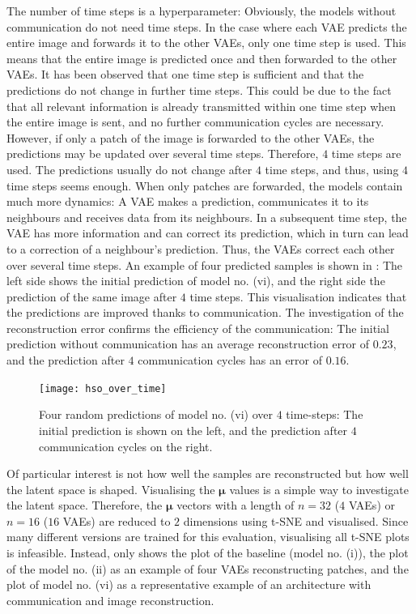 The number of time steps is a hyperparameter: Obviously, the models without communication do not need time steps. In the case where each VAE predicts the entire image and forwards it to the other VAEs, only one time step is used. This means that the entire image is predicted once and then forwarded to the other VAEs. It has been observed that one time step is sufficient and that the predictions do not change in further time steps. This could be due to the fact that all relevant information is already transmitted within one time step when the entire image is sent, and no further communication cycles are necessary. However, if only a patch of the image is forwarded to the other VAEs, the predictions may be updated over several time steps. Therefore, $4$ time steps are used. The predictions usually do not change after $4$ time steps, and thus, using $4$ time steps seems enough. When only patches are forwarded, the models contain much more dynamics: A VAE makes a prediction, communicates it to its neighbours and receives data from its neighbours. In a subsequent time step, the VAE has more information and can correct its prediction, which in turn can lead to a correction of a neighbour's prediction. Thus, the VAEs correct each other over several time steps. An example of four predicted samples is shown in : The left side shows the initial prediction of model no. (vi), and the right side the prediction of the same image after $4$ time steps. This visualisation indicates that the predictions are improved thanks to communication. The investigation of the reconstruction error confirms the efficiency of the communication: The initial prediction without communication has an average reconstruction error of $0.23$, and the prediction after $4$ communication cycles has an error of $0.16$.

\begin{figure}[h]
    \centering
    \texttt{[image: hso\_over\_time]}
    \caption[Change of the model's prediction over time]{Four random predictions of model no. (vi) over $4$ time-steps: The initial prediction is shown on the left, and the prediction after $4$ communication cycles on the right.}
\end{figure}

Of particular interest is not how well the samples are reconstructed but how well the latent space is shaped. Visualising the $\boldsymbol{\mu}$ values is a simple way to investigate the latent space. Therefore, the $\boldsymbol{\mu}$ vectors with a length of $n=32$ ($4$ VAEs) or $n=16$ ($16$ VAEs) are reduced to $2$ dimensions using t-SNE  and visualised. Since many different versions are trained for this evaluation, visualising all t-SNE plots is infeasible. Instead,  only shows the plot of the baseline (model no. (i)), the plot of the model no. (ii) as an example of four VAEs reconstructing patches, and the plot of model no. (vi) as a representative example of an architecture with communication and image reconstruction.

